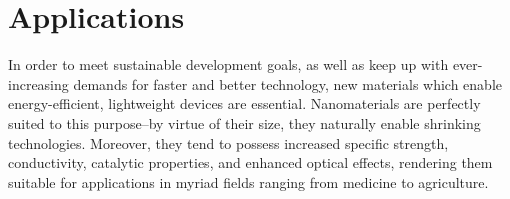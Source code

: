 \documentclass[11pt,a4paper,twoside]{report}  %
\numberwithin{equation}{section}					%
\numberwithin{figure}{section}						%
\begin{document}

\section{Applications}

In order to meet sustainable development goals, as well as keep up with ever-increasing demands for faster and better technology, new materials which enable energy-efficient, lightweight devices are essential. Nanomaterials are perfectly suited to this purpose--by virtue of their size, they naturally enable shrinking technologies. Moreover, they tend to possess increased specific strength, conductivity, catalytic properties, and enhanced optical effects, rendering them suitable for applications in myriad fields ranging from medicine to agriculture. 
\end{document}
